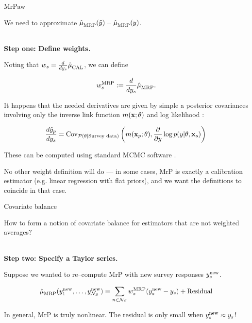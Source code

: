 \begin{frame}[t]{MrPaw}

We need to approximate $\hat{\mu}^{}_{\mathrm{MRP}}(\tilde{y}) - \hat{\mu}^{}_{\mathrm{MRP}}(y)$.

\vspace{1em}
\hrulefill\\
\textbf{Step one: Define weights.}

Noting that $w_s = \frac{d}{d y_s} \hat{\mu}^{}_{\mathrm{CAL}}$, we can define

$$
\wmrp_s := \frac{d}{d\y_s} \muhat_{\mrp}. %
$$

It happens that the needed derivatives are given
by simple a posterior covariances involving only the inverse
link function $m(\mathbf{x}; \theta)$ and
log likelihood \citep{giordano:2018:covariances}:

$$
\frac{d \hat{y}_p}{dy_s}  =
    \mathrm{Cov}_{\mathcal{P}(\theta \vert \textrm{Survey data})}\left( 
        m(\mathbf{x}_p; \theta),
        \frac{\partial}{\partial y} \log p(y \vert \theta, \mathbf{x}_s)\right)\,
$$

These can be computed using standard MCMC software \citep{brms}.

No other weight definition will do --- in some cases,
MrP is exactly a calibration estimator (e.g. linear regression with flat priors),
and we want the definitions to coincide in that case.

\end{frame}




\begin{frame}[t]{Covariate balance}


How to form a notion of covariate balance for estimators that are not weighted averages?


\vspace{1em}
\hrulefill\\
\textbf{Step two: Specify a Taylor series.}

\def\new{\mathrm{new}}
Suppose we wanted to re--compute MrP with new
survey responses $\y_s^{\new}$.

$$
\muhat_{\mrp}(\y_1^\new, \ldots, \y_{\nsur}^\new) =
\sumsur \w_s^\mrp (\y_s^\new  - \y_s) + \mathrm{Residual}
$$

In general, MrP is truly nonlinear. The residual is only small when $\y_s^\new \approx \y_s$!


\end{frame}


